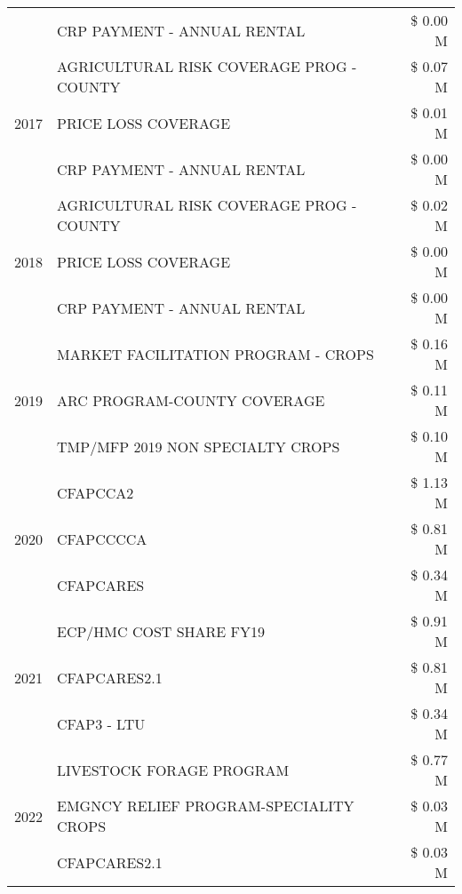\begin{tabular}{llr}
 & CRP PAYMENT - ANNUAL RENTAL & \$ 0.00 M \\
\cline{1-3}
\multirow[t]{3}{*}{2017} & AGRICULTURAL RISK COVERAGE PROG - COUNTY & \$ 0.07 M \\
 & PRICE LOSS COVERAGE & \$ 0.01 M \\
 & CRP PAYMENT - ANNUAL RENTAL & \$ 0.00 M \\
\cline{1-3}
\multirow[t]{3}{*}{2018} & AGRICULTURAL RISK COVERAGE PROG - COUNTY & \$ 0.02 M \\
 & PRICE LOSS COVERAGE & \$ 0.00 M \\
 & CRP PAYMENT - ANNUAL RENTAL & \$ 0.00 M \\
\cline{1-3}
\multirow[t]{3}{*}{2019} & MARKET FACILITATION PROGRAM - CROPS & \$ 0.16 M \\
 & ARC PROGRAM-COUNTY COVERAGE & \$ 0.11 M \\
 & TMP/MFP 2019 NON SPECIALTY CROPS & \$ 0.10 M \\
\cline{1-3}
\multirow[t]{3}{*}{2020} & CFAPCCA2 & \$ 1.13 M \\
 & CFAPCCCCA & \$ 0.81 M \\
 & CFAPCARES & \$ 0.34 M \\
\cline{1-3}
\multirow[t]{3}{*}{2021} & ECP/HMC COST SHARE FY19 & \$ 0.91 M \\
 & CFAPCARES2.1 & \$ 0.81 M \\
 & CFAP3 - LTU & \$ 0.34 M \\
\cline{1-3}
\multirow[t]{3}{*}{2022} & LIVESTOCK FORAGE PROGRAM & \$ 0.77 M \\
 & EMGNCY RELIEF PROGRAM-SPECIALITY CROPS & \$ 0.03 M \\
 & CFAPCARES2.1 & \$ 0.03 M \\
\cline{1-3}
\bottomrule
\end{tabular}
